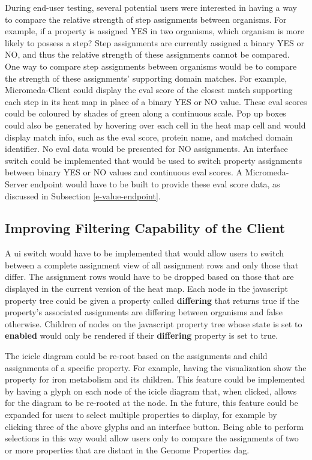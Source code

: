 During end-user testing, several potential users were interested in having a way to compare the relative strength of step assignments between organisms. For example, if a property is assigned YES in two organisms, which organism is more likely to possess a step? Step assignments are currently assigned a binary YES or NO, and thus the relative strength of these assignments cannot be compared. One way to compare step assignments between organisms would be to compare the strength of these assignments' supporting domain matches. For example, Micromeda-Client could display the \gls{eval} score of the closest match supporting each step in its heat map in place of a binary YES or NO value. These \gls{eval} scores could be coloured by shades of green along a continuous scale. Pop up boxes could also be generated by hovering over each cell in the heat map cell and would display match info, such as the \gls{eval} score, protein name, and matched domain identifier. No \gls{eval} data would be presented for NO assignments. An interface switch could be implemented that would be used to switch property assignments between binary YES or NO values and continuous \gls{eval} scores. A Micromeda-Server endpoint would have to be built to provide these \gls{eval} score data, as discussed in Subsection \ref{e-value-endpoint}.

\subsection{Improving Filtering Capability of the Client}

A \gls{ui} switch would have to be implemented that would allow users to switch between a complete assignment view of all assignment rows and only those that differ. The assignment rows would have to be dropped based on those that are displayed in the current version of the heat map. Each node in the \gls{javascript} property tree could be given a property called \textbf{differing} that returns true if the property's associated assignments are differing between organisms and false otherwise. Children of nodes on the \gls{javascript} property tree whose state is set to \textbf{enabled} would only be rendered if their \textbf{differing} property is set to true.

The icicle diagram could be re-root based on the assignments and child assignments of a specific property. For example, having the visualization show the property for iron metabolism and its children. This feature could be implemented by having a glyph on each node of the icicle diagram that, when clicked, allows for the diagram to be re-rooted at the node. In the future, this feature could be expanded for users to select multiple properties to display, for example by clicking three of the above glyphs and an interface button. Being able to perform selections in this way would allow users only to compare the assignments of two or more properties that are distant in the Genome Properties \gls{dag}.

